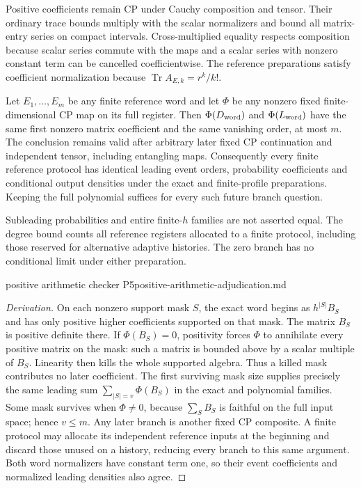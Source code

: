 Positive coefficients remain CP under Cauchy composition and tensor.
Their ordinary trace bounds multiply with the scalar normalizers and bound
all matrix-entry series on compact intervals. Cross-multiplied equality
respects composition because scalar series commute with the maps and a
scalar series with nonzero constant term can be cancelled coefficientwise.
The reference preparations satisfy coefficient normalization because
$\operatorname{Tr}A_{E,k}=r^k/k!$.

\begin{proposition}
\statusProved\quad
Let $E_1,\ldots,E_m$ be any finite reference word and let $\Phi$ be any
nonzero fixed finite-dimensional CP map on its full register. Then
$\Phi(D_{\rm word})$ and $\Phi(L_{\rm word})$ have the same first nonzero
matrix coefficient and the same vanishing order, at most $m$.
The conclusion remains valid after arbitrary later fixed CP continuation
and independent tensor, including entangling maps.
Consequently every finite reference protocol has identical leading event
orders, probability coefficients and conditional output densities under
the exact and finite-profile preparations. Keeping the full polynomial
suffices for every such future branch question.
\end{proposition}
\begin{scope}
Subleading probabilities and entire finite-$h$ families are not asserted
equal. The degree bound counts all reference registers allocated to a
finite protocol, including those reserved for alternative adaptive histories.
The zero branch has no conditional limit under either preparation.
\end{scope}
{positive arithmetic checker P5}{positive-arithmetic-adjudication.md}

\begin{proof}[Derivation]
On each nonzero support mask $S$, the exact word begins as
$h^{|S|}B_S$ and has only positive higher coefficients supported on that
mask. The matrix $B_S$ is positive definite there. If $\Phi(B_S)=0$,
positivity forces $\Phi$ to annihilate every positive matrix on the mask:
such a matrix is bounded above by a scalar multiple of $B_S$. Linearity
then kills the whole supported algebra. Thus a killed mask contributes
no later coefficient. The first surviving mask size supplies precisely
the same leading sum $\sum_{|S|=v}\Phi(B_S)$ in the exact and polynomial
families. Some mask survives when $\Phi\ne0$, because $\sum_SB_S$ is
faithful on the full input space; hence $v\leq m$.
Any later branch is another fixed CP composite. A finite protocol may
allocate its independent reference inputs at the beginning and discard
those unused on a history, reducing every branch to this same argument.
Both word normalizers have constant term one, so their event coefficients
and normalized leading densities also agree.
\end{proof}

